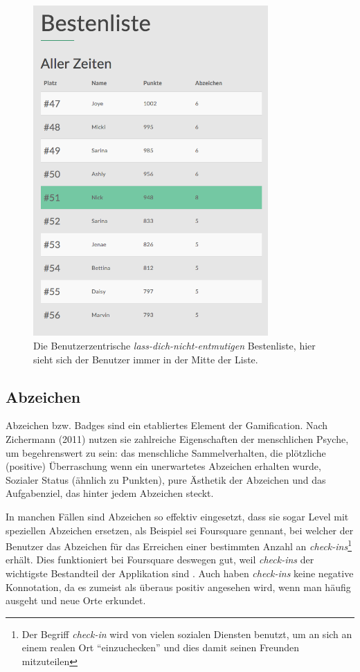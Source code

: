 \documentclass[12pt,twoside]{book}
\begin{document}
\begin{figure}[htbp]
    \centering
    \includegraphics[width=0.8\textwidth]{images/infoboard_leaderboard_user.png}
    \caption{Die Benutzerzentrische \textit{lass-dich-nicht-entmutigen} Bestenliste, hier sieht sich der Benutzer immer in der Mitte der Liste.}
    \label{fig:leaderboarduser}
\end{figure}

\subsection{Abzeichen}
Abzeichen bzw. Badges sind ein etabliertes Element der Gamification. Nach Zichermann (2011) \citep[pp. 55]{zichermann2011gamification} nutzen sie zahlreiche Eigenschaften der menschlichen Psyche, um begehrenswert zu sein: das menschliche Sammelverhalten, die plötzliche (positive) Überraschung wenn ein unerwartetes Abzeichen erhalten wurde, Sozialer Status (ähnlich zu Punkten), pure Ästhetik der Abzeichen und das Aufgabenziel, das hinter jedem Abzeichen steckt.

In manchen Fällen sind Abzeichen so effektiv eingesetzt, dass sie sogar Level mit speziellen Abzeichen ersetzen, als Beispiel sei Foursquare gennant, bei welcher der Benutzer das Abzeichen für das Erreichen einer bestimmten Anzahl an \textit{check-ins}\footnote{Der Begriff \textit{check-in} wird von vielen sozialen Diensten benutzt, um an sich an einem realen Ort ``einzuchecken'' und dies damit seinen Freunden mitzuteilen} erhält. Dies funktioniert bei Foursquare deswegen gut, weil \textit{check-ins} der wichtigste Bestandteil der Applikation sind \citep[pp. 57]{zichermann2011gamification}. Auch haben \textit{check-ins} keine negative Konnotation, da es zumeist als überaus positiv angesehen wird, wenn man häufig ausgeht und neue Orte erkundet.
\end{document}
